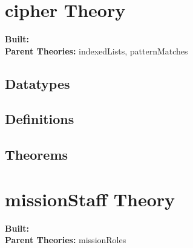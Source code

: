 \documentclass[11pt, twoside]{article}
\begin{document}






\tableofcontents
\cleardoublepage
\HOLpagestyle

\section{cipher Theory}
\begin{flushleft}
\textbf{Built:} \HOLcipherDate \\[2pt]
\textbf{Parent Theories:} indexedLists, patternMatches
\end{flushleft}

\subsection{Datatypes}

\HOLcipherDatatypes

\subsection{Definitions}

\HOLcipherDefinitions

\subsection{Theorems}

\HOLcipherTheorems

\section{missionStaff Theory}
\begin{flushleft}
\textbf{Built:} \HOLmissionStaffDate \\[2pt]
\textbf{Parent Theories:} missionRoles
\end{flushleft}
\end{document}
